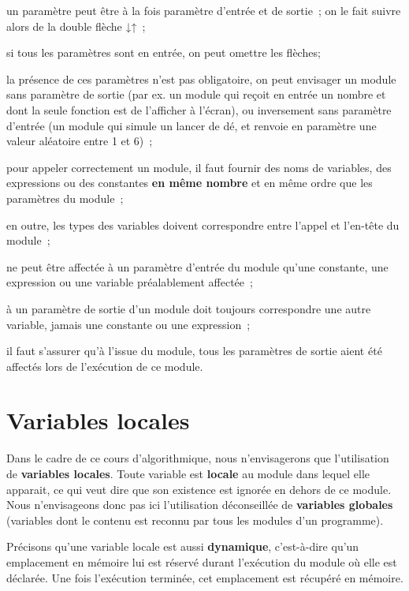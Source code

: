 	\begin{liste}
	\item {
	{un paramètre peut être à la fois paramètre
	d’entrée et de sortie~; on le fait suivre alors de la double flèche
	}{↓↑}{~;}}
	\item {
	si tous les paramètres sont en entrée, on peut omettre les flèches;}
	\item {
	la présence de ces paramètres n’est pas obligatoire, on peut envisager
	un module sans paramètre de sortie (par ex. un module qui reçoit en
	entrée un nombre et dont la seule fonction est de l’afficher à
	l’écran), ou inversement sans paramètre d’entrée (un module qui simule
	un lancer de dé, et renvoie en paramètre une valeur aléatoire entre 1
	et 6)~;}
	\item {
	{pour appeler correctement un module, il faut
	fournir des noms de variables, des expressions ou des constantes
	}{\textbf{en même
	nombre}}{ et en même ordre que les paramètres
	du module~;}}
	\item {
	en outre, les types des variables doivent correspondre entre l’appel et
	l’en-tête du module~;}
	\item {
	ne peut être affectée à un paramètre d’entrée du module qu’une
	constante, une expression ou une variable préalablement affectée~;}
	\item {
	à un paramètre de sortie d’un module doit toujours correspondre une
	autre variable, jamais une constante ou une expression~;}
	\item {
	il faut s’assurer qu’à l’issue du module, tous les paramètres de sortie
	aient été affectés lors de l’exécution de ce module.}
	\end{liste}

\section{Variables locales}

	Dans le cadre de ce cours d’algorithmique,
	nous n’envisagerons que l’utilisation de 
	\textbf{variables locales}. 
	Toute variable est \textbf{locale} au module 
	dans lequel elle apparait, ce qui veut dire que son existence
	est ignorée en dehors de ce module. 
	Nous n’envisageons donc pas ici l’utilisation déconseillée de 
	\textbf{variables globales} 
	(variables dont le contenu est reconnu 
	par tous les modules d’un programme).

	Précisons qu'une variable locale est aussi
	\textbf{dynamique}, c’est-à-dire qu’un emplacement en mémoire lui est
	réservé durant l’exécution du module où elle est déclarée. Une fois
	l’exécution terminée, cet emplacement est récupéré en mémoire.

